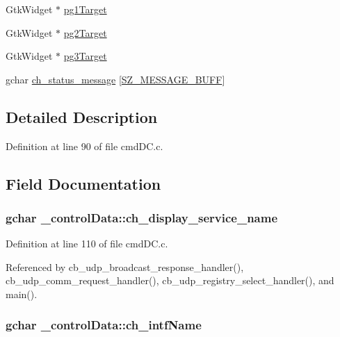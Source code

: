 \begin{DoxyCompactItemize}
\item 
Gtk\+Widget $\ast$ \hyperlink{struct__control_data_adb6c2830054c6309779d676082e94447}{pg1\+Target}
\item 
Gtk\+Widget $\ast$ \hyperlink{struct__control_data_a201f826ab99699df83a85c5e4572ffb2}{pg2\+Target}
\item 
Gtk\+Widget $\ast$ \hyperlink{struct__control_data_a67d45a0e9ba1fcaabea3600dfee830b9}{pg3\+Target}
\item 
gchar \hyperlink{struct__control_data_aa6d5e703090d185edd3e0b5224542ce5}{ch\+\_\+status\+\_\+message} \mbox{[}\hyperlink{gtk_d_s_8c_ab5903aa853c3769389e570c8490feb1e}{S\+Z\+\_\+\+M\+E\+S\+S\+A\+G\+E\+\_\+\+B\+U\+F\+F}\mbox{]}
\end{DoxyCompactItemize}


\subsection{Detailed Description}


Definition at line 90 of file cmd\+D\+C.\+c.



\subsection{Field Documentation}
\hypertarget{struct__control_data_a94aa04264eafaa65a7a869a540bbdf93}{
\subsubsection[{ch\+\_\+display\+\_\+service\+\_\+name}]{\setlength{\rightskip}{0pt plus 5cm}gchar \+\_\+control\+Data\+::ch\+\_\+display\+\_\+service\+\_\+name}}\label{struct__control_data_a94aa04264eafaa65a7a869a540bbdf93}


Definition at line 110 of file cmd\+D\+C.\+c.



Referenced by cb\+\_\+udp\+\_\+broadcast\+\_\+response\+\_\+handler(), cb\+\_\+udp\+\_\+comm\+\_\+request\+\_\+handler(), cb\+\_\+udp\+\_\+registry\+\_\+select\+\_\+handler(), and main().

\hypertarget{struct__control_data_adac6cf5482e4bbabb442f8ab27e4bc62}{
\subsubsection[{ch\+\_\+intf\+Name}]{\setlength{\rightskip}{0pt plus 5cm}gchar \+\_\+control\+Data\+::ch\+\_\+intf\+Name}}\label{struct__control_data_adac6cf5482e4bbabb442f8ab27e4bc62}


